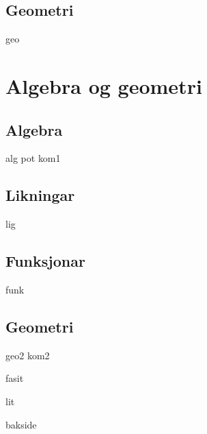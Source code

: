 \chapter{Geometri}
\newpage
{geo}

\part{Algebra og geometri \label{Del2}}
\chapter{Algebra}
\newpage
{alg}
{pot}
\newpage
{kom1}

\chapter{Likningar \label{Likningar}}
\newpage
{lig}

\chapter{Funksjonar \label{Funksjoner}}
{funk}

\chapter{Geometri}
\newpage
{geo2}
\newpage
{kom2}

\newpage
{fasit}

{lit}
{\printindex {}
	}
{bakside}

















